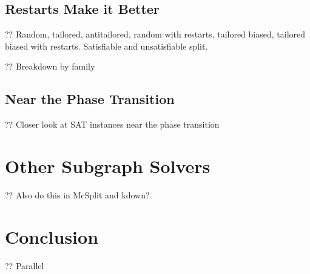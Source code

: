 \documentclass{article}
\begin{document}
\subsection{Restarts Make it Better}

?? Random, tailored, antitailored, random with restarts, tailored biased, tailored biased with
restarts. Satisfiable and unsatisfiable split.

?? Breakdown by family

\subsection{Near the Phase Transition}

?? Closer look at SAT instances near the phase transition

\section{Other Subgraph Solvers}

?? Also do this in McSplit and kdown?

\section{Conclusion}

?? Parallel



\end{document}
